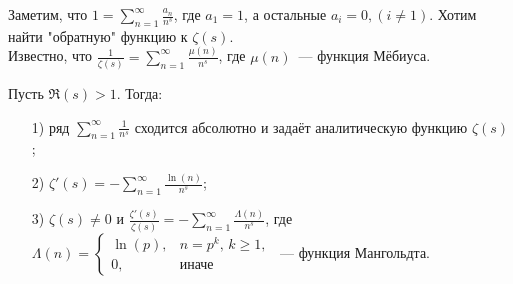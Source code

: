 Заметим, что $\displaystyle 1=\sum\limits_{n=1}^\infty \frac{a_n}{n^s}$, где $a_1=1$, а остальные $a_i =0, (i \ne 1)$. Хотим найти "обратную" функцию к $\zeta(s).$\\
Известно, что $\displaystyle \frac{1}{\zeta(s)} = \sum\limits_{n=1}^\infty \frac{\mu(n)}{n^s}$, где $\mu(n)$ — функция Мёбиуса.

\begin{theorem} \label{l2_th3}
	Пусть $\Re(s) > 1$. Тогда:
	\begin{enumerate}[nolistsep]
		\item[1)] ряд $\displaystyle \sum\limits_{n=1}^\infty \frac{1}{n^s}$ сходится абсолютно и задаёт аналитическую функцию $\zeta(s)$;
		\item[2)] $\displaystyle \zeta'(s) = -\sum\limits_{n=1}^\infty \frac{\ln(n)}{n^s}$;
		\item[3)] $\displaystyle \zeta(s) \ne 0$ и $\displaystyle \frac{\zeta'(s)}{\zeta(s)} = -\sum\limits_{n=1}^\infty \frac{\Lambda(n)}{n^s}$, где $\Lambda(n) =
		\begin{cases}
			\ln(p), & n=p^k,\,k\geq 1,\\
			0, & \text{иначе}
		\end{cases}$ — функция Мангольдта.
	\end{enumerate}
\end{theorem}
